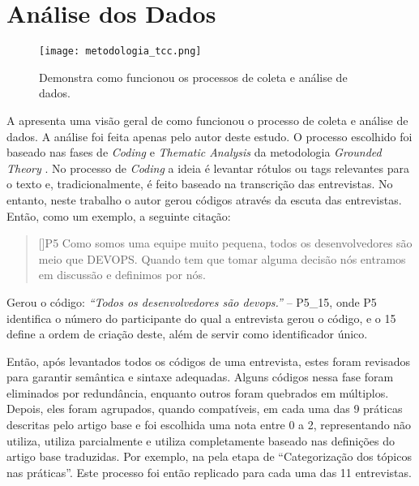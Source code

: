 \section{Análise dos Dados}

\begin{figure}[ht]
\begin{center}
\texttt{[image: metodologia\_tcc.png]}
\end{center}
\caption[Fluxograma da Metodologia]{
    Demonstra como funcionou os processos de coleta e análise de dados.
}\label{fluxograma_metodologia}
\end{figure}

    
A  apresenta uma visão geral de como funcionou o processo de coleta e análise de dados. A análise foi feita apenas pelo autor deste estudo. O processo escolhido foi baseado nas fases de \emph{Coding} e \emph{Thematic Analysis} da metodologia \emph{Grounded Theory} \cite{groundedTheory}. No processo de \emph{Coding} a ideia é levantar rótulos ou tags relevantes para o texto e, tradicionalmente, é feito baseado na transcrição das entrevistas. No entanto, neste trabalho o autor gerou códigos através da escuta das entrevistas. Então, como um exemplo, a seguinte citação:

\begin{quotation}[]{P5}
Como somos uma equipe muito pequena, todos os desenvolvedores são meio que DEVOPS. Quando tem que tomar alguma decisão nós entramos em discussão e definimos por nós.
\end{quotation}

Gerou o código: \emph{``Todos os desenvolvedores são devops.''} -- P5\_15, onde P5 identifica o número do participante do qual a entrevista gerou o código, e o 15 define a ordem de criação deste, além de servir como identificador único.

Então, após levantados todos os códigos de uma entrevista, estes foram revisados para garantir semântica e sintaxe adequadas. Alguns códigos nessa fase foram eliminados por redundância, enquanto outros foram quebrados em múltiplos. Depois, eles foram agrupados, quando compatíveis, em cada uma das 9 práticas descritas pelo artigo base e foi escolhida uma nota entre 0 a 2, representando não utiliza, utiliza parcialmente e utiliza completamente baseado nas definições do artigo base traduzidas. Por exemplo, na  pela etapa de ``Categorização dos tópicos nas práticas''. Este processo foi então replicado para cada uma das 11 entrevistas.

